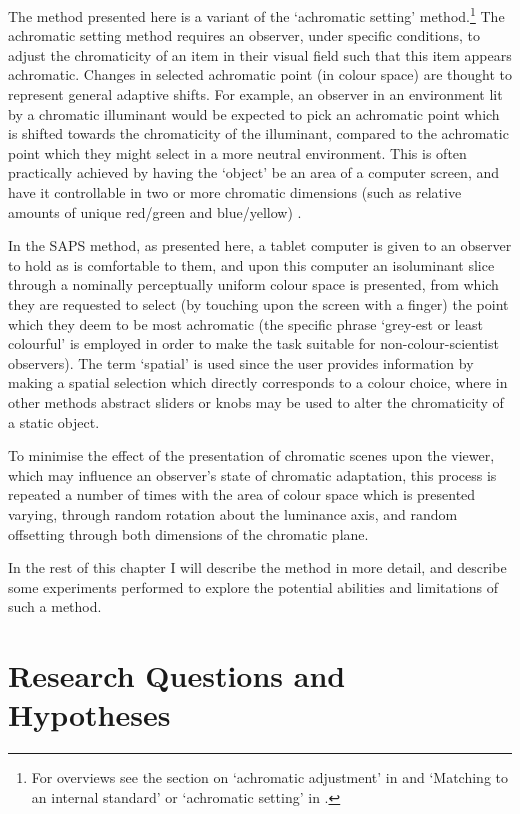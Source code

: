 The method presented here is a variant of the `achromatic setting' method.\footnote{For overviews see %
the section on `achromatic adjustment' in \citet{foster_color_2011} and `Matching to an internal standard' or `achromatic setting' in \citet{smithson_sensory_2005}.} The achromatic setting method requires an observer, under specific conditions, to adjust the chromaticity of an item in their visual field such that this item appears achromatic. Changes in selected achromatic point (in colour space) are thought to represent general adaptive shifts. For example, an observer in an environment lit by a chromatic illuminant would be expected to pick an achromatic point which is shifted towards the chromaticity of the illuminant, compared to the achromatic point which they might select in a more neutral environment. This is often practically achieved by having the `object' be an area of a computer screen, and have it controllable in two or more chromatic dimensions (such as relative amounts of unique red/green and blue/yellow) %
. 

In the \gls{SAPS} method, as presented here, a tablet computer is given to an observer to hold as is comfortable to them, and upon this computer an isoluminant slice through a nominally perceptually uniform colour space is presented, from which they are requested to select (by touching upon the screen with a finger) the point which they deem to be most achromatic (the specific phrase `grey-est or least colourful' is employed in order to make the task suitable for non-colour-scientist observers). The term `spatial' is used since the user provides information by making a spatial selection which directly corresponds to a colour choice, where in other methods abstract sliders or knobs may be used to alter the chromaticity of a static object.

To minimise the effect of the presentation of chromatic scenes upon the viewer, which may influence an observer's state of chromatic adaptation, this process is repeated a number of times with the area of colour space which is presented varying, through random rotation about the luminance axis, and random offsetting through both dimensions of the chromatic plane.

In the rest of this chapter I will describe the method in more detail, and describe some experiments performed to explore the potential abilities and limitations of such a method.

\section{Research Questions and Hypotheses} \label{sec:qandhyp}

